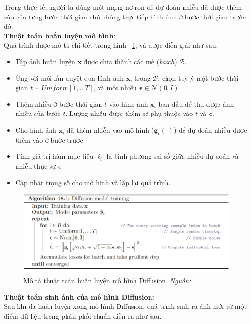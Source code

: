 Trong thực tế, người ta dùng một mạng nơ-ron để dự đoán nhiễu đã được thêm vào của từng bước thời gian chứ không trực tiếp hình ảnh ở bước thời gian trước đó.\\
%
\textbf{Thuật toán huấn luyện mô hình:}\\
%
Quá trình được mô tả chi tiết trong hình ~\ref{fig:model-diffusion-training-1}, và được diễn giải như sau:
\begin{itemize}
	\item Tập ảnh huấn luyện $\mathbf{x}$ được chia thành các mẻ (\textit{batch}) $\mathcal{B}$.
	\item Ứng với mỗi lần duyệt qua hình ảnh $\mathbf{x}_i$ trong $\mathcal{B}$, chọn tuỳ ý một bước thời gian $\mathit{t}\sim Uniform[1,...T]$, và một nhiễu $\mathbf{\epsilon} \in \mathcal{N}(0,I)$.
	\item Thêm nhiễu ở bước thời gian $\mathit{t}$ vào hình ảnh $\mathbf{x}_i$ ban đầu để thu được ảnh nhiễu của bước $\mathit{t}$. Lượng nhiễu được thêm sẽ phụ thuộc vào $\mathit{t}$ và $\mathbf{\epsilon}$.
	\item Cho hình ảnh $\mathbf{x}_i$ đã thêm nhiễu vào mô hình ($\mathbf{g}_t(.)$) để dự đoán nhiễu được thêm vào ở bước trước.
	\item Tính giá trị hàm mục tiêu $\ell_i$ là bình phương sai số giữa nhiễu dự đoán và nhiễu thực sự $\epsilon$
	\item Cập nhật trọng số cho mô hình và lặp lại quá trình.
\end{itemize}
%
\begin{figure}[htp]
	\centering
	\includegraphics[width=0.9\linewidth]{Images/model-diffusion-training-1.png}
	\caption{
		Mô tả thuật toán huấn luyện mô hình Diffusion.
	\textit{Nguồn: \cite{prince2023understanding}}
	}
	\label{fig:model-diffusion-training-1}
\end{figure}
%
\textbf{Thuật toán sinh ảnh của mô hình Diffusion:}\\
%
Sau khi đã huấn luyện xong mô hình Diffusion, quá trình sinh ra ảnh mới từ một điểm dữ liệu trong phân phối chuẩn diễn ra như sau.
